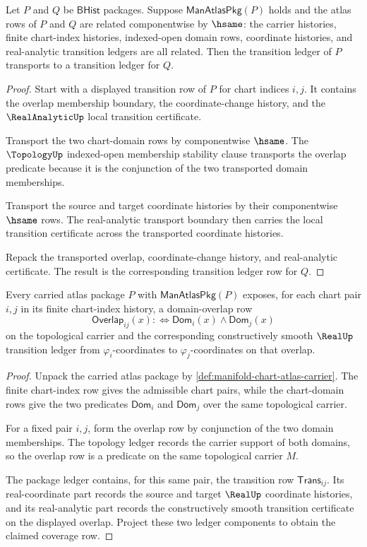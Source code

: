 \begin{theorem}
\label{thm:manifoldup-transition-ledger-stability}
Let $P$ and $Q$ be $\mathsf{BHist}$ packages. Suppose
$\mathsf{ManAtlasPkg}(P)$ holds and the atlas rows of $P$ and $Q$ are related
componentwise by $\hsame$: the carrier histories, finite chart-index histories,
indexed-open domain rows, coordinate histories, and real-analytic transition
ledgers are all related. Then the transition ledger of $P$ transports to a
transition ledger for $Q$.
\end{theorem}
\begin{proof}
Start with a displayed transition row of $P$ for chart indices $i,j$. It
contains the overlap membership boundary, the coordinate-change history, and
the $\RealAnalyticUp$ local transition certificate.

Transport the two chart-domain rows by componentwise $\hsame$. The
$\TopologyUp$ indexed-open membership stability clause transports the overlap
predicate because it is the conjunction of the two transported domain
memberships.

Transport the source and target coordinate histories by their componentwise
$\hsame$ rows. The real-analytic transport boundary then carries the local
transition certificate across the transported coordinate histories.

Repack the transported overlap, coordinate-change history, and real-analytic
certificate. The result is the corresponding transition ledger row for $Q$.
\end{proof}

\begin{theorem}
\label{thm:manifold-atlas-overlap-coverage}
Every carried atlas package $P$ with $\mathsf{ManAtlasPkg}(P)$ exposes, for
each chart pair $i,j$ in its finite chart-index history, a domain-overlap row
$$
\mathsf{Overlap}_{ij}(x)
:\Longleftrightarrow
\mathsf{Dom}_i(x)\wedge\mathsf{Dom}_j(x)
$$
on the topological carrier and the corresponding constructively smooth
$\RealUp$ transition ledger from $\varphi_i$-coordinates to
$\varphi_j$-coordinates on that overlap.
\end{theorem}
\begin{proof}
Unpack the carried atlas package by
\autoref{def:manifold-chart-atlas-carrier}. The finite chart-index row gives
the admissible chart pairs, while the chart-domain rows give the two predicates
$\mathsf{Dom}_i$ and $\mathsf{Dom}_j$ over the same topological carrier.

For a fixed pair $i,j$, form the overlap row by conjunction of the two domain
memberships. The topology ledger records the carrier support of both domains,
so the overlap row is a predicate on the same topological carrier $M$.

The package ledger contains, for this same pair, the transition row
$\mathsf{Trans}_{ij}$. Its real-coordinate part records the source and target
$\RealUp$ coordinate histories, and its real-analytic part records the
constructively smooth transition certificate on the displayed overlap. Project
these two ledger components to obtain the claimed coverage row.
\end{proof}

